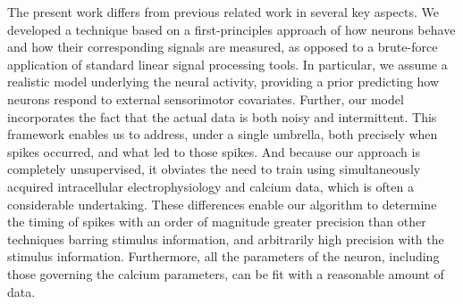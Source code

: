 The present work differs from previous related work in several key aspects.  We developed a technique based on a first-principles approach of how neurons behave and how their corresponding signals are measured, as opposed to a brute-force application of standard linear signal processing tools.  In particular, we assume a realistic model underlying the neural activity, providing a prior predicting how neurons respond to external sensorimotor covariates.  Further, our model incorporates the fact that the actual data is both noisy and intermittent.  This framework enables us to address, under a single umbrella, both precisely when spikes occurred, and what led to those spikes.  And because our approach is completely unsupervised, it obviates the need to train using simultaneously acquired intracellular electrophysiology and calcium data, which is often a considerable undertaking.  These differences enable our algorithm to determine the timing of spikes with an order of magnitude greater precision than other techniques barring stimulus information, and arbitrarily high precision with the stimulus information.  Furthermore, all the parameters of the neuron, including those governing the calcium parameters, can be fit with a reasonable amount of data.


